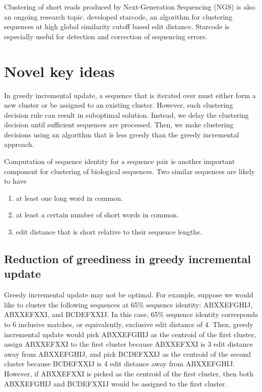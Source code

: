 \documentclass[]{article}
\begin{document}
Clustering of short reads produced by Next-Generation Sequencing (NGS) is also an ongoing research topic.
\cite{zorita2015starcode} developed starcode, an algorithm for clustering sequences at high global similarity cutoff based edit distance.
Starcode is especially useful for detection and correction of sequencing errors. 

\section{Novel key ideas}

In greedy incremental update, a sequence that is iterated over must either form a new cluster or be assigned to an existing cluster.
However, such clustering decision rule can result in suboptimal solution.
Instead, we delay the clustering decision until sufficient sequences are processed.
Then, we make clustering decisions using an algorithm that is less greedy than the greedy incremental approach.

Computation of sequence identity for a sequence pair is another important component for clustering of biological sequences. 
Two similar sequences are likely to have
\begin{enumerate}
	\item at least one long word in common.
	\item at least a certain number of short words in common.
	\item edit distance that is short relative to their sequence lengths.  
\end{enumerate}

\subsection{Reduction of greediness in greedy incremental update}

Greedy incremental update may not be optimal. 
For example, suppose we would like to cluster the following sequences at 65\% sequence identity:
ABXXEFGHIJ, 
ABXXEFXXI, and
 BCDEFXXIJ.
In this case, 65\% sequence identity corresponds to 6 inclusive matches, or equivalently, exclusive edit distance of 4.
Then, greedy incremental update would pick ABXXEFGHIJ as the centroid of the first cluster, 
assign ABXXEFXXI to the first cluster because ABXXEFXXI is 3 edit distance away from ABXXEFGHIJ, 
and pick BCDEFXXIJ as the centroid of the second cluster because BCDEFXXIJ is 4 edit distance away from ABXXEFGHIJ.
However, if ABXXEFXXI is picked as the centroid of the first cluster, then both ABXXEFGHIJ and BCDEFXXIJ would be assigned to the first cluster. 
\end{document}
